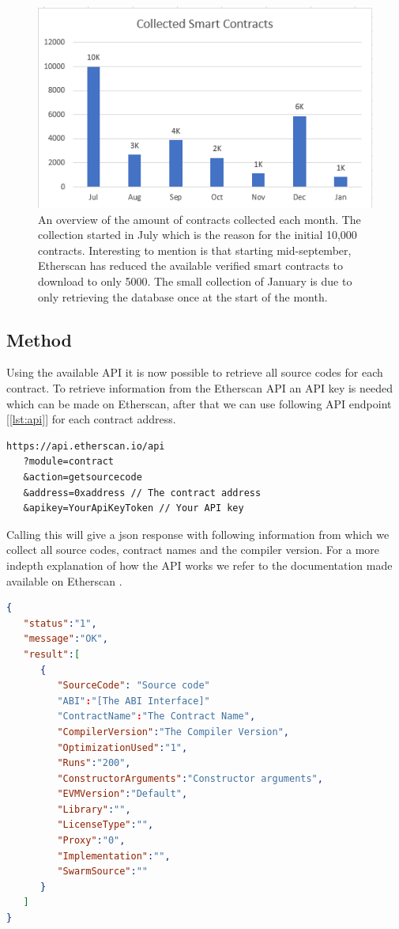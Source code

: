 \documentclass[sigconf]{acmart}
\begin{document}
\begin{figure}[h]
  \centering
  \includegraphics[width=\linewidth]{img/collected_contracts.PNG}
  \caption{An overview of the amount of contracts collected each month. The collection started in July which is the reason for the initial 10,000 contracts. Interesting to mention is that starting mid-september, Etherscan has reduced the available verified smart contracts to download to only 5000. The small collection of January is due to only retrieving the database once at the start of the month.}
  \label{fig:database}
\end{figure}
\subsection{Method}
Using the available API it is now possible to retrieve all source codes for each contract. To retrieve information from the Etherscan API an API key is needed which can be made on Etherscan, after that we can use following API endpoint  [\ref{lst:api}] for each contract address. 

\begin{lstlisting}[language=Solidity, caption=Api call, label={lst:api}]
https://api.etherscan.io/api
   ?module=contract
   &action=getsourcecode
   &address=0xaddress // The contract address
   &apikey=YourApiKeyToken // Your API key
\end{lstlisting}

Calling this will give a json response with following information from which
we collect all source codes, contract names and the compiler version. For a more indepth explanation of how the API works we refer to the documentation made available on Etherscan \cite{etherscan_api}. 
\begin{lstlisting}[language=json,firstnumber=1]
{
   "status":"1",
   "message":"OK",
   "result":[
      {
         "SourceCode": "Source code"
         "ABI":"[The ABI Interface]"
         "ContractName":"The Contract Name",
         "CompilerVersion":"The Compiler Version",
         "OptimizationUsed":"1",
         "Runs":"200",
         "ConstructorArguments":"Constructor arguments",
         "EVMVersion":"Default",
         "Library":"",
         "LicenseType":"",
         "Proxy":"0",
         "Implementation":"",
         "SwarmSource":""
      }
   ]
}
\end{lstlisting}
\end{document}

